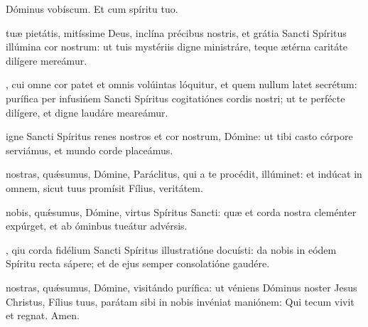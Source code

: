 \documentclass[fontsize=9pt,paper=A6,twoside,BCOR=1mm,DIV=22,headinclude]{scrarticle}
\begin{document}
\begin{multicols}{2}
{\V Dóminus vobíscum. \R Et cum spíritu tuo.

\oremus

 tuæ pietátis, mitíssime Deus, inclína précibus nostris, et grátia Sancti Spíritus illúmina cor nostrum: ut tuis mystériis digne ministráre, teque ætérna caritáte dilígere mereámur.

, cui omne cor patet et omnis volúintas lóquitur, et quem nullum latet secrétum: purífica per infusińem Sancti Spíritus cogitatiónes cordis nostri; ut te perfécte dilígere, et digne laudáre meareámur.

 igne Sancti Spíritus renes nostros et cor nostrum, Dómine: ut tibi casto córpore serviámus, et mundo corde placeámus.

 nostras, qu\'æsumus, Dómine, Paráclitus, qui a te procédit, illúminet: et indúcat in omnem, sicut tuus promísit Fílius, veritátem.

 nobis, qu\'æsumus, Dómine, virtus Spíritus Sancti: quæ et corda nostra cleménter expúrget, et ab óminbus tueátur advérsis.

, qiu corda fidélium Sancti Spíritus illustratióne docuísti: da nobis in eódem Spíritu recta sápere; et de ejus semper consolatióne gaudére.

 nostras, qu\'æsumus, Dómine, visitándo purífica: ut véniens Dóminus noster Jesus Christus, Fílius tuus, parátam sibi in nobis invéniat maniónem: Qui tecum vivit et regnat. \R Amen.

}

\pagebreak
\end{multicols}


\vspace{0.2em}
\end{document}
